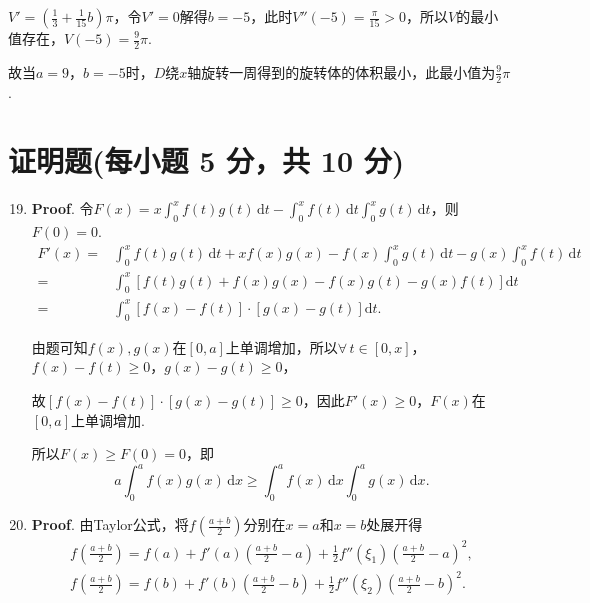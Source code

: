 \documentclass[../Main.tex]{subfiles}
\begin{document}
\begin{enumerate}
          $V'=\left(\frac{1}{3}+\frac{1}{15}b\right)\pi$，令$V'=0$解得$b=-5$，此时$V''(-5)=\frac{\pi}{15}>0$，所以$V$的最小值存在，$V(-5)=\frac{9}{2}\pi$.

          故当$a=9$，$b=-5$时，$D$绕$x$轴旋转一周得到的旋转体的体积最小，此最小值为$\frac{9}{2}
              \pi$.
\end{enumerate}

\section{证明题(每小题 5 分，共 10 分)}
\begin{enumerate}
    \setcounter{enumi}{18}
    \item \textbf{Proof}. 令$F(x)=x\int_{0}^{x}f(t)g(t)\,\mathrm{d}t-\int_{0}^{x}
              f(t)\,\mathrm{d}t\int_{0}^{x}g(t)\,\mathrm{d}t$，则$F(0)=0$.
          \[
              \begin{aligned}
                  F'(x) = & \int_{0}^{x}f(t)g(t)\,\mathrm{d}t+x f(x)g(x)-f(x)\int_{0}^{x}g(t)\,\mathrm{d}t-g(x)\int_{0}^{x}f(t)\,\mathrm{d}t \\
                  =       & \int_{0}^{x}\left[f(t)g(t)+f(x)g(x)-f(x)g(t)-g(x)f(t)\right]\mathrm{d}t                                          \\
                  =       & \int_{0}^{x}\left[f(x)-f(t)\right]\cdot\left[g(x)-g(t)\right]\mathrm{d}t.
              \end{aligned}
          \]

          由题可知$f(x),g(x)$在$[0,a]$上单调增加，所以$\forall\,t\in[0,x]$，$f(x)-f(t
              )\geq0$，$g(x)-g(t)\geq0$，

          故$\left[f(x)-f(t)\right]\cdot\left[g(x)-g(t)\right]\geq0$，因此$F'(x)\geq0$，$F
              (x)$在$[0,a]$上单调增加.

          所以$F(x)\geq F(0)=0$，即
          \[
              a\int_{0}^{a}f(x)g(x)\,\mathrm{d}x\geq \int_{0}^{a}f(x)\,\mathrm{d}x\int_{0}^{a}
              g(x)\,\mathrm{d}x.
          \]

    \item \textbf{Proof}. 由Taylor公式，将$f\left(\frac{a+b}{2}\right)$分别在$x
              =a$和$x=b$处展开得
          \[
              \begin{gathered}
                  f\left(\frac{a+b}{2}\right)=f(a)+f'(a)\left(\frac{a+b}{2}-a\right)+\frac{1}{2}f''(\xi_1)\left(\frac{a+b}{2}-a\right)^{2},\\
                  f\left(\frac{a+b}{2}\right)=f(b)+f'(b)\left(\frac{a+b}{2}-b\right)+\frac{1}{2}f''(\xi_2)\left(\frac{a+b}{2}-b\right)^{2}.
              \end{gathered}
          \]


\end{enumerate}
\end{document}
